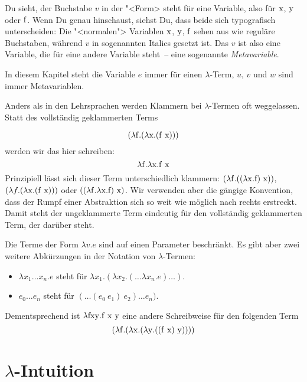 %
Du sieht, der Buchstabe $v$ in der "<Form> steht für eine Variable,
also für $\mathrm x$, $\mathrm y$ oder $\mathrm f$.  Wenn Du genau hinschaust,
siehst Du, dass beide sich typografisch unterscheiden: Die
"<normalen"> Variablen $\mathrm x$, $\mathrm y$, $\mathrm f$ sehen aus wie
reguläre Buchstaben, während $v$ in sogenannten Italics gesetzt ist.
Das $v$ ist also eine Variable, die für eine andere Variable steht~--
eine sogenannte \textit{Metavariable}.

In diesem Kapitel steht die Variable $e$ immer für einen
$\lambda$-Term, $u$, $v$ und $w$ sind immer Metavariablen.

Anders als in den Lehrsprachen werden Klammern bei $\lambda$-Termen
oft weggelassen.  Statt des vollständig geklammerten Terms

\begin{displaymath}
  (\lambda \mathrm f.(\lambda \mathrm x.(\mathrm f~\mathrm x)))
\end{displaymath}
%
werden wir das hier schreiben: 
%
\begin{displaymath}
  \lambda \mathrm f.\lambda \mathrm x.\mathrm f~\mathrm x
\end{displaymath}
%
Prinzipiell lässt sich dieser Term unterschiedlich
klammern: $(\lambda \mathrm f.((\lambda \mathrm x.\mathrm f)~\mathrm x))$, $(\lambda
f.(\lambda \mathrm x.(\mathrm f~\mathrm x)))$ oder $((\lambda \mathrm f.\lambda
\mathrm x.\mathrm f)~\mathrm x)$.  Wir verwenden aber die gängige Konvention,
dass der Rumpf einer Abstraktion sich so weit wie möglich nach
rechts erstreckt.   Damit steht der ungeklammerte Term eindeutig für
den vollständig geklammerten Term, der darüber steht.

Die Terme der Form $\lambda v.e$ sind auf einen Parameter
beschränkt.  Es gibt aber zwei weitere Abkürzungen
in der Notation von $\lambda$-Termen:
%
\begin{itemize}
\item $\lambda x_1 \ldots x_n.e$ steht für $\lambda x_1.(\lambda
  x_2.(\ldots\lambda x_n.e)\ldots)$.
\item $e_0 \ldots e_n$ steht für $(\ldots(e_0~e_1)~e_2) \ldots e_n)$.
\end{itemize}
%
Dementsprechend ist $\lambda \mathrm{fxy}.\mathrm f~\mathrm x~\mathrm y$ eine andere Schreibweise für
den folgenden Term \[(\lambda \mathrm f.(\lambda \mathrm x.(\lambda \mathrm y.((\mathrm f~\mathrm x)~\mathrm y))))\]

\section{$\lambda$-Intuition}

